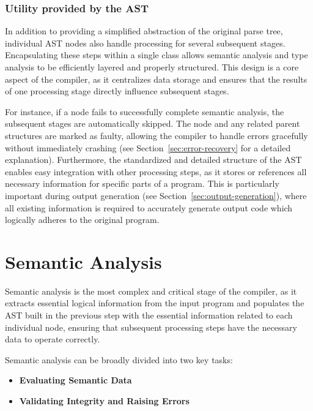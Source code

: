 \subsubsection{Utility provided by the AST}

In addition to providing a simplified abstraction of the original parse tree, individual AST nodes also handle processing for several subsequent stages. Encapsulating these steps within a single class allows semantic analysis and type analysis to be efficiently layered and properly structured. This design is a core aspect of the compiler, as it centralizes data storage and ensures that the results of one processing stage directly influence subsequent stages.

For instance, if a node fails to successfully complete semantic analysis, the subsequent stages are automatically skipped. The node and any related parent structures are marked as faulty, allowing the compiler to handle errors gracefully without immediately crashing (see Section~\ref{sec:error-recovery} for a detailed explanation). Furthermore, the standardized and detailed structure of the AST enables easy integration with other processing steps, as it stores or references all necessary information for specific parts of a program. This is particularly important during output generation (see Section~\ref{sec:output-generation}), where all existing information is required to accurately generate output code which logically adheres to the original program.

\section{Semantic Analysis}
\label{sec:semantic-analysis}

Semantic analysis is the most complex and critical stage of the compiler, as it extracts essential logical information from the input program and populates the AST built in the previous step with the essential information related to each individual node, ensuring that subsequent processing steps have the necessary data to operate correctly.

Semantic analysis can be broadly divided into two key tasks:

\begin{itemize}
	\item \textbf{Evaluating Semantic Data}
	\item \textbf{Validating Integrity and Raising Errors}
\end{itemize}

